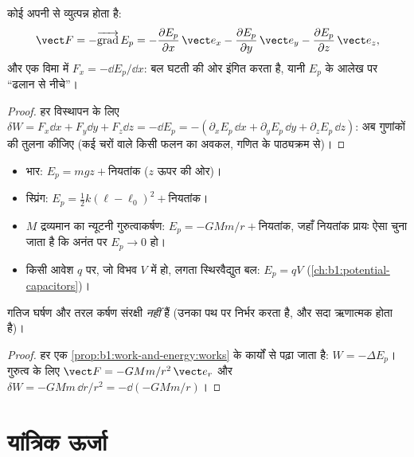 \begin{proposition}[स्थितिज ऊर्जा से बल]\label{prop:b1:work-and-energy:gradient}
कोई  अपनी  से व्युत्पन्न होता है:
\[
\vect F = -\overrightarrow{\operatorname{grad}}\,E_p
= -\frac{\partial E_p}{\partial x}\,\vect e_x
- \frac{\partial E_p}{\partial y}\,\vect e_y
- \frac{\partial E_p}{\partial z}\,\vect e_z ,
\]
और एक विमा में $F_x = -\dd E_p/\dd x$: बल घटती  की ओर इंगित
करता है, यानी $E_p$ के आलेख पर ``ढलान से नीचे''।
\end{proposition}

\begin{proof}
हर विस्थापन के लिए $\delta W = F_x\dd x + F_y\dd y + F_z\dd z = -\dd E_p = -(\partial_xE_p\,\dd x
+ \partial_yE_p\,\dd y + \partial_zE_p\,\dd z)$: अब गुणांकों की तुलना
कीजिए (कई चरों वाले किसी फलन का अवकल, गणित के पाठ्यक्रम से)।
\end{proof}

\begin{proposition}[सामान्य स्थितिज ऊर्जाएँ]\label{prop:b1:work-and-energy:eps}
\begin{itemize}
  \item भार: $E_p = mgz + \text{नियतांक}$ ($z$ ऊपर की ओर)।
  \item स्प्रिंग: $E_p = \tfrac12 k(\ell - \ell_0)^2 + \text{नियतांक}$।
  \item $M$ द्रव्यमान का न्यूटनी गुरुत्वाकर्षण: $E_p = -GMm/r + \text{नियतांक}$,
        जहाँ नियतांक प्रायः ऐसा चुना जाता है कि अनंत पर $E_p \to 0$ हो।
  \item किसी आवेश $q$ पर, जो विभव $V$ में हो, लगता स्थिरवैद्युत बल:
        $E_p = qV$ (\cref{ch:b1:potential-capacitors})।
\end{itemize}
गतिज घर्षण और तरल कर्षण संरक्षी \emph{नहीं} हैं (उनका  पथ पर निर्भर
करता है, और सदा ऋणात्मक होता है)।
\end{proposition}

\begin{proof}
हर एक \cref{prop:b1:work-and-energy:works} के कार्यों से पढ़ा जाता है:
$W = -\Delta E_p$। गुरुत्व के लिए $\vect F = -GMm/r^2\,\vect e_r$ और
$\delta W = -GMm\,\dd r/r^2 = -\dd(-GMm/r)$।
\end{proof}

\section{यांत्रिक ऊर्जा}

